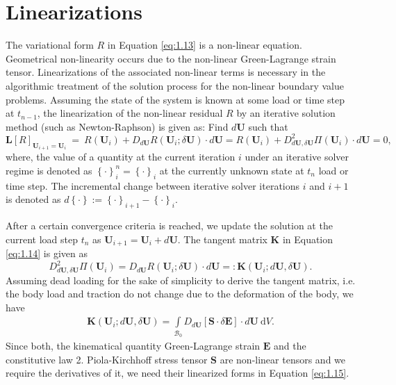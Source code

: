 \documentclass[11pt,a4paper,final]{article}
\begin{document}
\section{Linearizations}
The variational form $R$ in Equation \eqref{eq:1.13} is a non-linear equation. Geometrical non-linearity occurs due to the non-linear Green-Lagrange strain tensor. Linearizations of the associated non-linear terms is necessary in the algorithmic treatment of the solution process for the non-linear boundary value problems. Assuming the state of the system is known at some load or time step at $t_{n-1}$, the linearization of the non-linear residual $R$ by an iterative solution method (such as Newton-Raphson) is given as: Find $d\mathbf{U}$ such that 
\begin{equation}
\mathbf{L}\left[ R \right]_{\mathbf{U}_{i+1} = \mathbf{U}_{i}} \ = \ R(\mathbf{U}_{i}) + D_{d\mathbf{U}} R(\mathbf{U}_i; \delta \mathbf{U}) \cdot d\mathbf{U} = R(\mathbf{U}_{i}) + D^2_{d\mathbf{U}, \delta\mathbf{U}} \Pi(\mathbf{U}_{i}) \cdot d\mathbf{U} = 0,
\label{eq:1.14}
\end{equation}
where, the value of a quantity at the current iteration $i$ under an iterative solver regime is denoted as ${\left\lbrace \cdot \right\rbrace}_{i}^{n} = {\left\lbrace \cdot \right\rbrace}_{i}$ at the currently unknown state at $t_n$ load or time step. The incremental change between iterative solver iterations $i$ and $i+1$ is denoted as $d \left\lbrace \cdot \right\rbrace := {\left\lbrace \cdot \right\rbrace}_{i+1} - {\left\lbrace \cdot \right\rbrace}_{i}$. \par 

After a certain convergence criteria is reached, we update the solution at the current load step $t_n$ as $\mathbf{U}_{i+1} = \mathbf{U}_i + d \mathbf{U}$. The tangent matrix $\mathbf{K}$ in Equation \eqref{eq:1.14} is given as 
\begin{equation}
D^2_{d\mathbf{U}, \delta\mathbf{U}} \Pi(\mathbf{U}_{i}) = D_{d\mathbf{U}} R(\mathbf{U}_i; \delta \mathbf{U}) \cdot d\mathbf{U} =: \mathbf{K}(\mathbf{U}_i; d\mathbf{U}, \delta \mathbf{U}).
\end{equation}
Assuming dead loading for the sake of simplicity to derive the tangent matrix, i.e. the body load and traction do not change due to the deformation of the body, we have
\begin{align}
\mathbf{K}(\mathbf{U}_i; d\mathbf{U}, \delta \mathbf{U}) = \int\limits_{\mathcal{B}_0} D_{d\mathbf{U}} \left[ \mathbf{S} \cdot \delta \mathbf{E} \right] \cdot d\mathbf{U} \ \mathrm{d}V.
\label{eq:1.15}
\end{align}
Since both, the kinematical quantity Green-Lagrange strain $\mathbf{E}$ and the constitutive law 2. Piola-Kirchhoff stress tensor $\mathbf{S}$ are non-linear tensors and we require the derivatives of it, we need their linearized forms in Equation \eqref{eq:1.15}.
\end{document}
